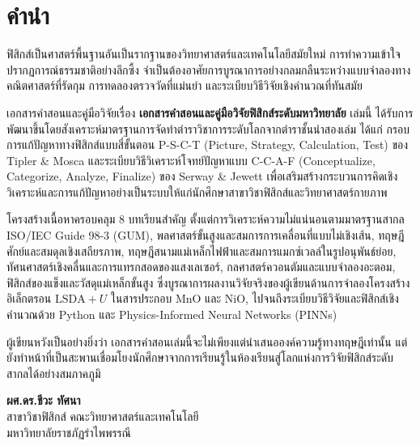 \chapter*{คำนำ}

ฟิสิกส์เป็นศาสตร์พื้นฐานอันเป็นรากฐานของวิทยาศาสตร์และเทคโนโลยีสมัยใหม่ การทำความเข้าใจปรากฏการณ์ธรรมชาติอย่างลึกซึ้ง จำเป็นต้องอาศัยการบูรณาการอย่างกลมกลืนระหว่างแบบจำลองทางคณิตศาสตร์ที่รัดกุม การทดลองตรวจวัดที่แม่นยำ และระเบียบวิธีวิจัยเชิงคำนวณที่ทันสมัย

เอกสารคำสอนและคู่มือวิจัยเรื่อง \textbf{เอกสารคำสอนและคู่มือวิจัยฟิสิกส์ระดับมหาวิทยาลัย} เล่มนี้ ได้รับการพัฒนาขึ้นโดยสังเคราะห์มาตรฐานการจัดทำตำราวิชาการระดับโลกจากตำราชั้นนำสองเล่ม ได้แก่ กรอบการแก้ปัญหาทางฟิสิกส์แบบสี่ขั้นตอน P-S-C-T (Picture, Strategy, Calculation, Test) ของ Tipler \& Mosca และระเบียบวิธีวิเคราะห์โจทย์ปัญหาแบบ C-C-A-F (Conceptualize, Categorize, Analyze, Finalize) ของ Serway \& Jewett เพื่อเสริมสร้างกระบวนการคิดเชิงวิเคราะห์และการแก้ปัญหาอย่างเป็นระบบให้แก่นักศึกษาสาขาวิชาฟิสิกส์และวิทยาศาสตร์กายภาพ

โครงสร้างเนื้อหาครอบคลุม 8 บทเรียนสำคัญ ตั้งแต่การวิเคราะห์ความไม่แน่นอนตามมาตรฐานสากล ISO/IEC Guide 98-3 (GUM), พลศาสตร์ขั้นสูงและสมการการเคลื่อนที่แบบไม่เชิงเส้น, ทฤษฎีศักย์และสมดุลเชิงเสถียรภาพ, ทฤษฎีสนามแม่เหล็กไฟฟ้าและสมการแมกซ์เวลล์ในรูปอนุพันธ์ย่อย, ทัศนศาสตร์เชิงคลื่นและการแทรกสอดของแสงเลเซอร์, กลศาสตร์ควอนตัมและแบบจำลองอะตอม, ฟิสิกส์ของแข็งและวัสดุแม่เหล็กขั้นสูง ซึ่งบูรณาการผลงานวิจัยจริงของผู้เขียนด้านการจำลองโครงสร้างอิเล็กตรอน $\text{LSDA}+U$ ในสารประกอบ $\text{MnO}$ และ $\text{NiO}$, ไปจนถึงระเบียบวิธีวิจัยและฟิสิกส์เชิงคำนวณด้วย Python และ Physics-Informed Neural Networks (PINNs)

ผู้เขียนหวังเป็นอย่างยิ่งว่า เอกสารคำสอนเล่มนี้จะไม่เพียงแต่นำเสนอองค์ความรู้ทางทฤษฎีเท่านั้น แต่ยังทำหน้าที่เป็นสะพานเชื่อมโยงนักศึกษาจากการเรียนรู้ในห้องเรียนสู่โลกแห่งการวิจัยฟิสิกส์ระดับสากลได้อย่างสมภาคภูมิ

\vspace{1.5cm}
\begin{flushright}
\textbf{ผศ.ดร.ชีวะ ทัศนา}\\
สาขาวิชาฟิสิกส์ คณะวิทยาศาสตร์และเทคโนโลยี\\
มหาวิทยาลัยราชภัฏรำไพพรรณี
\end{flushright}
